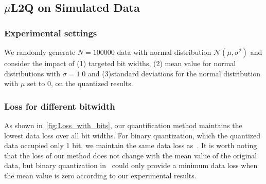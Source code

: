 \subsection{$\mu$L2Q on Simulated Data}
\subsubsection{Experimental settings}
We randomly generate $N=100000$ data with normal distribution $\mathcal N(\mu, \sigma^2)$
and consider the impact of 
(1) targeted bit widths, (2) mean value for normal distributions with $\sigma=1.0$ and (3)standard deviations for the normal distribution with $\mu$ set to 0, on the quantized results.
\subsubsection{Loss for different bitwidth}


As shown in~\ref{fig:Loss_with_bits},
our quantification method maintains the lowest data loss over all bit widths. 
For binary quantization, which the quantized data occupied only 1 bit, we maintain the same data loss as~\cite{zhou2016dorefa}. It is worth noting that the loss of our method does not change with the mean value of the original data, 
but binary quantization in~\cite{zhou2016dorefa} could only provide a minimum data loss when the mean value is zero according to our experimental results.

